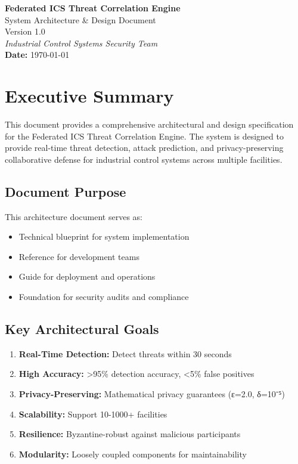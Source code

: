 \documentclass[12pt,a4paper]{article}
\begin{document}
\begin{center}
    \vspace*{0.5cm}
    {\Huge \textbf{Federated ICS Threat Correlation Engine}}\\[0.4cm]
    {\LARGE System Architecture \& Design Document}\\[0.3cm]
    {\large Version 1.0}\\[0.2cm]
    \textit{Industrial Control Systems Security Team}\\[0.1cm]
    \textbf{Date:} \today\\
    \vspace{0.5cm}
\end{center}

\tableofcontents
\newpage

\section{Executive Summary}

This document provides a comprehensive architectural and design specification for the Federated ICS Threat Correlation Engine.
The system is designed to provide real-time threat detection, attack prediction, and privacy-preserving collaborative defense for industrial control systems across multiple facilities.

\subsection{Document Purpose}

This architecture document serves as:
\begin{itemize}[leftmargin=1cm,itemsep=0pt]
    \item Technical blueprint for system implementation
    \item Reference for development teams
    \item Guide for deployment and operations
    \item Foundation for security audits and compliance
\end{itemize}

\subsection{Key Architectural Goals}

\begin{enumerate}[leftmargin=1cm,itemsep=0pt]
    \item \textbf{Real-Time Detection:} Detect threats within 30 seconds
    \item \textbf{High Accuracy:} >95\% detection accuracy, <5\% false positives
    \item \textbf{Privacy-Preserving:} Mathematical privacy guarantees (ε=2.0, δ=10⁻⁵)
    \item \textbf{Scalability:} Support 10-1000+ facilities
    \item \textbf{Resilience:} Byzantine-robust against malicious participants
    \item \textbf{Modularity:} Loosely coupled components for maintainability
\end{enumerate}
\end{document}
